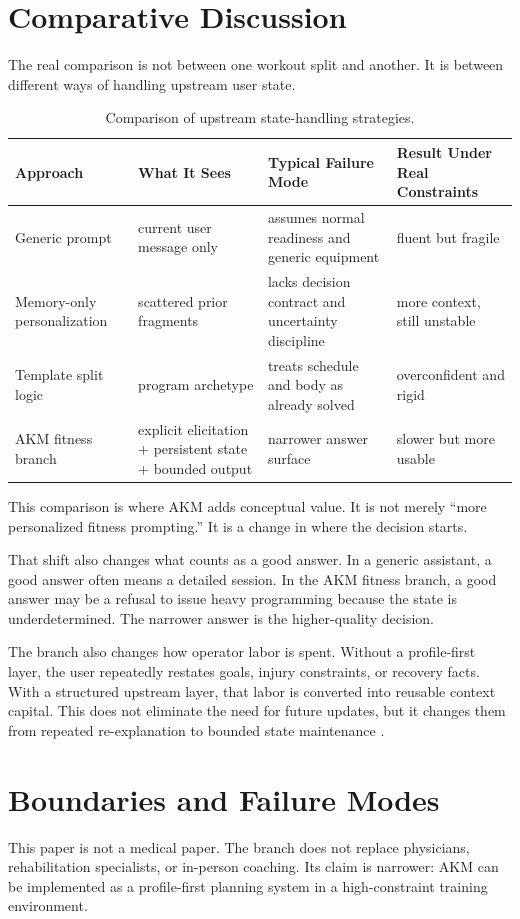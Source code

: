 \documentclass[11pt]{article}
\begin{document}
\section{Comparative Discussion}
The real comparison is not between one workout split and another. It is between different ways of handling upstream user state.
\begin{table}[htbp]
\centering
\begin{tabular}{p{} p{} p{} p{}}
\toprule
Approach & What It Sees & Typical Failure Mode & Result Under Real Constraints \\
\midrule
Generic prompt & current user message only & assumes normal readiness and generic equipment & fluent but fragile \\
Memory-only personalization & scattered prior fragments & lacks decision contract and uncertainty discipline & more context, still unstable \\
Template split logic & program archetype & treats schedule and body as already solved & overconfident and rigid \\
AKM fitness branch & explicit elicitation + persistent state + bounded output & narrower answer surface & slower but more usable \\
\bottomrule
\end{tabular}
\caption{Comparison of upstream state-handling strategies.}
\end{table}
This comparison is where AKM adds conceptual value. It is not merely ``more personalized fitness prompting.'' It is a change in where the decision starts.

That shift also changes what counts as a good answer. In a generic assistant, a good answer often means a detailed session. In the AKM fitness branch, a good answer may be a refusal to issue heavy programming because the state is underdetermined. The narrower answer is the higher-quality decision.

The branch also changes how operator labor is spent. Without a profile-first layer, the user repeatedly restates goals, injury constraints, or recovery facts. With a structured upstream layer, that labor is converted into reusable context capital. This does not eliminate the need for future updates, but it changes them from repeated re-explanation to bounded state maintenance \citep{oyemike2025alignment,holstein2025thinking,foschini2025preference,white2023prompt}.
\section{Boundaries and Failure Modes}
This paper is not a medical paper. The branch does not replace physicians, rehabilitation specialists, or in-person coaching. Its claim is narrower: AKM can be implemented as a profile-first planning system in a high-constraint training environment.
\end{document}
